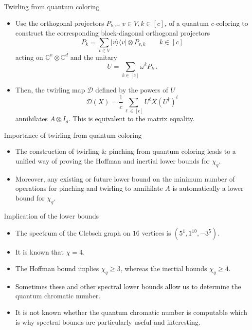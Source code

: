 \documentclass{beamer}
\newcommand{\C}{\mathbb{C}}
\newcommand{\cD}{\mathcal{D}}
\renewcommand{\>}{\rangle}
\newcommand{\<}{\langle}
\begin{document}
%

\begin{frame}{Twirling from quantum coloring}

\begin{itemize}

\item Use the orthogonal projectors $P_{k,v}$, $v\in V, k \in [c]$, of a quantum $c$-coloring
%
to construct the corresponding block-diagonal orthogonal projectors 
\[
P_k = \sum_{v\in V} |v\>\<v| \otimes P_{v,k} \quad \quad k \in [c]
\]
acting on $\C^n\otimes \C^d$ and the unitary
\[
U = \sum_{k \in [c]} \omega^{k} P_k\,. 
\]

\item Then, the twirling map $\cD$ defined by the powers of $U$
\[
\cD(X) = \frac{1}{c} \sum_{\ell\in [c]} U^\ell X (U^\dagger)^\ell
\]
annihilates $A\otimes I_d$. This is equivalent to the matrix equality.
\end{itemize}

\end{frame}

%

\begin{frame}{Importance of twirling from quantum coloring}
\begin{itemize}
\item The construction of twirling \& pinching from quantum coloring leads to a unified way of proving the Hoffman and inertial lower bounds for $\chi_q$.

\medskip
\item Moreover, any existing or future lower bound on the minimum number of operations for pinching and twirling to annihilate $A$ is automatically a lower bound for $\chi_q$.
\end{itemize}
\end{frame}

%

\begin{frame}{Implication of the lower bounds}
\begin{itemize}
\item The spectrum of the Clebsch graph on $16$ vertices is $(5^1, 1^{10}, -3^5)$.

\item It is known that $\chi=4$.

\item The Hoffman bound implies $\chi_q \ge 3$, whereas the inertial bounds $\chi_q \ge 4$.

\item Sometimes these and other spectral lower bounds allow us to determine the quantum chromatic number. 

\item It is not known whether the quantum chromatic number is computable which is why spectral bounds are particularly useful and interesting.
\end{itemize}
\end{frame}
\end{document}
